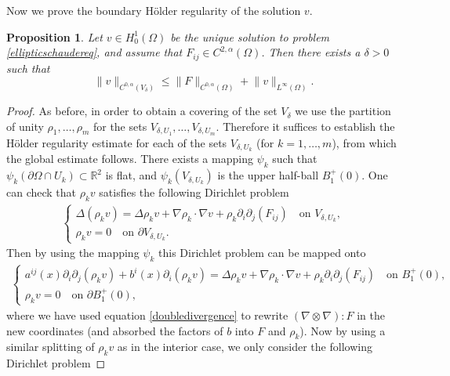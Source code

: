 \documentclass[12pt,a4paper]{article}
\newtheorem{proposition}[theorem]{Proposition}
\theoremstyle{definition}
\theoremstyle{remark}
\numberwithin{equation}{section}
\begin{document}
\begin{appendices}
Now we prove the boundary Hölder regularity of the solution $v$.
\begin{proposition}
Let $v \in H^1_0 (\Omega)$ be the unique solution to problem \eqref{ellipticschaudereq}, and assume that $F_{ij} \in C^{2,\alpha} (\Omega)$. Then there exists a $\delta > 0$ such that
\begin{equation}
\lVert v \rVert_{C^{0,\alpha} (V_\delta)} \leq \lVert F \rVert_{C^{0,\alpha} (\Omega)} + \lVert v \rVert_{L^\infty (\Omega)}.
\end{equation}
\end{proposition}
\begin{proof}
As before, in order to obtain a covering of the set $V_\delta$ we use the partition of unity $\rho_1, \ldots, \rho_m$ for the sets $V_{\delta, U_1}, \ldots, V_{\delta, U_m}$. Therefore it suffices to establish the Hölder regularity estimate for each of the sets $V_{\delta, U_k}$ (for $k = 1, \ldots, m$), from which the global estimate follows. There exists a mapping $\psi_k$ such that $\psi_k (\partial \Omega \cap U_k) \subset \mathbb{R}^2$ is flat, and $\psi_k (V_{\delta,U_k})$ is the upper half-ball $B_1^+ (0)$. One can check that $\rho_k v$ satisfies the following Dirichlet problem 
\begin{align*}
\begin{cases}
\Delta (\rho_k v) = \Delta \rho_k v + \nabla \rho_k \cdot \nabla v + \rho_k \partial_i \partial_j (F_{ij}) \quad \text{on } V_{\delta, U_k}, \\
\rho_k v = 0 \quad \text{on } \partial V_{\delta, U_k}.
\end{cases}
\end{align*}
Then by using the mapping $\psi_k$ this Dirichlet problem can be mapped onto
\begin{align} \label{boundarydirichletproblem}
\begin{cases}
a^{ij} (x) \partial_i  \partial_j (\rho_k v) + b^i (x) \partial_i (\rho_k v) = \Delta \rho_k v + \nabla \rho_k \cdot \nabla v + \rho_k \partial_i \partial_j (F_{ij}) \quad \text{on } B_1^+ (0), \\
\rho_k v = 0 \quad \text{on } \partial B_1^+ (0),
\end{cases}
\end{align}
where we have used equation \eqref{doubledivergence} to rewrite $(\nabla \otimes \nabla) : F$ in the new coordinates (and absorbed the factors of $b$ into $F$ and $\rho_k$). Now by using a similar splitting of $\rho_k v$ as in the interior case, we only consider the following Dirichlet problem

\end{proof}
\end{appendices}
\end{document}
